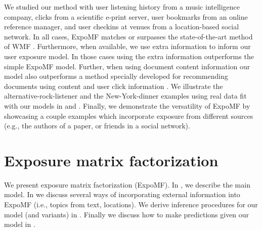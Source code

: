 We studied our method with user listening history from a music intelligence company, clicks from a scientific e-print server, user
bookmarks from an online reference manager, and user checkins at venues from a 
location-based social network. In all cases, ExpoMF matches or surpasses
the state-of-the-art method of \gls{WMF} \citep{hu2008collaborative}. Furthermore, when
available, we use extra information to inform our user exposure model. In those
cases using the extra information outperforms the simple ExpoMF model.
Further, when using document content information our model also
outperforms a method specially developed for recommending documents using content and user click information 
\citep{wang2011collaborative}. We illustrate the
alternative-rock-listener and the New-York-dinner examples using real data fit 
with our models in  and . 
Finally, we demonstrate the versatility of ExpoMF by showcasing a couple examples which incorporate exposure from different sources (e.g., the authors of a paper, or friends in a social network). 






\section{Exposure matrix factorization}\label{sec:model}

We present exposure matrix factorization (ExpoMF). 
In , we describe the main model. 
In  we discuss several ways 
of incorporating external information into ExpoMF (i.e., topics from text, locations). 
We derive inference procedures for our model (and variants) in . Finally we discuss how to make predictions given our model in .

